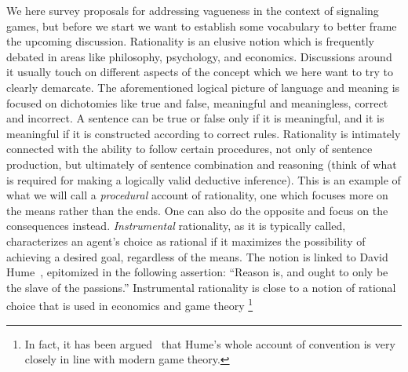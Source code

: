 \documentclass[a4paper]{article}
\begin{document}

We here survey proposals for addressing vagueness in the context of signaling games, but before we start we want to establish some vocabulary to better frame the upcoming discussion.
Rationality is an elusive notion which is frequently debated in areas like philosophy, psychology, and economics.
Discussions around it usually touch on different aspects of the concept which we here want to try to clearly demarcate.
The aforementioned logical picture of language and meaning is focused on dichotomies like true and false, meaningful and meaningless, correct and incorrect.
A sentence can be true or false only if it is meaningful, and it is meaningful if it is constructed according to correct rules.
Rationality is intimately connected with the ability to follow certain procedures, not only of sentence production, but ultimately of sentence combination and reasoning (think of what is required for making a logically valid deductive inference).
This is an example of what we will call a \emph{procedural} account of rationality, one which focuses more on the means rather than the ends.
One can also do the opposite and focus on the consequences instead.
\emph{Instrumental} rationality, as it is typically called, characterizes an agent's choice as rational if it maximizes the possibility of achieving a desired goal, regardless of the means.
The notion is linked to David Hume~\parencite*{hume_treatise_1738}, epitomized in the following assertion: ``Reason is, and ought to only be the slave of the passions.''
Instrumental rationality is close to a notion of rational choice that is used in economics and game theory%
\footnote{In fact, it has been argued~\parencite{vanderschraaf_informal_1998} that Hume's whole account of convention is very closely in line with modern game theory.}%
\end{document}
